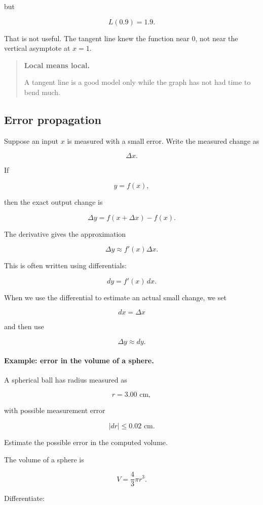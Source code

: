 but

\[
L(0.9)=1.9.
\]

That is not useful.  The tangent line knew the function near \(0\), not near the
vertical asymptote at \(x=1\).

\begin{quote}
\textbf{Local means local.}

A tangent line is a good model only while the graph has not had time to bend much.
\end{quote}

\subsection{Error propagation}
\label{subsec:error-propagation}

Suppose an input \(x\) is measured with a small error.  Write the measured change as

\[
\Delta x.
\]

If

\[
y=f(x),
\]

then the exact output change is

\[
\Delta y=f(x+\Delta x)-f(x).
\]

The derivative gives the approximation

\[
\Delta y\approx f'(x)\Delta x.
\]

This is often written using differentials:

\[
dy=f'(x)\,dx.
\]

When we use the differential to estimate an actual small change, we set

\[
dx=\Delta x
\]

and then use

\[
\boxed{
\Delta y\approx dy.
}
\]

\paragraph{Example: error in the volume of a sphere.}
A spherical ball has radius measured as

\[
r=3.00\text{ cm},
\]

with possible measurement error

\[
|dr|\le 0.02\text{ cm}.
\]

Estimate the possible error in the computed volume.

The volume of a sphere is

\[
V=\frac43\pi r^3.
\]

Differentiate:

